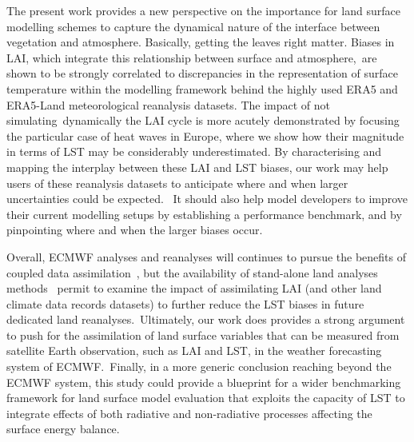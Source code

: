 \documentclass[gmd, manuscript]{copernicus}
\begin{document}
{The present work provides a new perspective on the importance for land
surface modelling schemes to capture the dynamical nature of the
interface between vegetation and atmosphere. Basically, getting the
leaves right matter. Biases in LAI, which integrate this relationship
between surface and atmosphere,~are shown to be strongly correlated to
discrepancies in the representation of surface temperature within the
modelling framework behind the highly used ERA5 and ERA5-Land
meteorological reanalysis datasets. The impact of not
simulating~dynamically the LAI cycle is more acutely demonstrated by
focusing the particular case of heat waves in Europe, where we show how
their magnitude in terms of LST may be considerably underestimated. By
characterising and mapping the interplay between these LAI and LST
biases, our work may help users of these reanalysis datasets to
anticipate where and when larger uncertainties could be expected.~ It
should also help model developers to improve their current modelling
setups by establishing a performance benchmark, and by pinpointing where
and when the larger biases occur.~

Overall, ECMWF analyses and reanalyses will continues to pursue the
benefits of coupled data assimilation~\citep{de_Rosnay_2022}, but the
availability of stand-alone land analyses methods~\citep{Fairbairn_2019}
permit to examine the impact of assimilating LAI (and other land climate
data records datasets) to further reduce the LST biases in future
dedicated land reanalyses.~Ultimately, our work does provides a strong
argument to push for the assimilation of land surface variables that can
be measured from satellite Earth observation, such as LAI and LST, in
the weather forecasting system of ECMWF.~Finally, in a more generic
conclusion reaching beyond the ECMWF system, this study could provide a
blueprint for a wider benchmarking framework for land surface model
evaluation that exploits the capacity of LST to integrate effects of
both radiative and non-radiative processes affecting the surface energy
balance.






}
\end{document}
